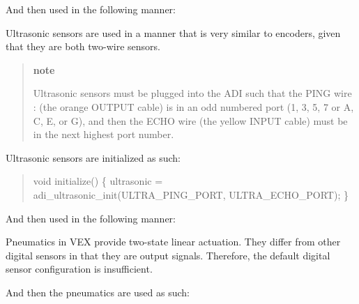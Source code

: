 And then used in the following manner\+:

Ultrasonic sensors are used in a manner that is very similar to encoders, given that they are both two-\/wire sensors.

\begin{quote}
{\bfseries note}

Ultrasonic sensors must be plugged into the A\+DI such that the P\+I\+NG wire \+: (the orange O\+U\+T\+P\+UT cable) is in an odd numbered port (1, 3, 5, 7 or \textquotesingle{}A\textquotesingle{}, \textquotesingle{}C\textquotesingle{}, \textquotesingle{}E\textquotesingle{}, or \textquotesingle{}G\textquotesingle{}), and then the E\+C\+HO wire (the yellow I\+N\+P\+UT cable) must be in the next highest port number.

\end{quote}
Ultrasonic sensors are initialized as such\+:

\begin{quote}

\begin{DoxyCode}
void initialize() \{
  ultrasonic = adi\_ultrasonic\_init(ULTRA\_PING\_PORT, ULTRA\_ECHO\_PORT);
\}
\end{DoxyCode}
 \end{quote}


And then used in the following manner\+:

Pneumatics in V\+EX provide two-\/state linear actuation. They differ from other digital sensors in that they are output signals. Therefore, the default digital sensor configuration is insufficient.

And then the pneumatics are used as such\+: 